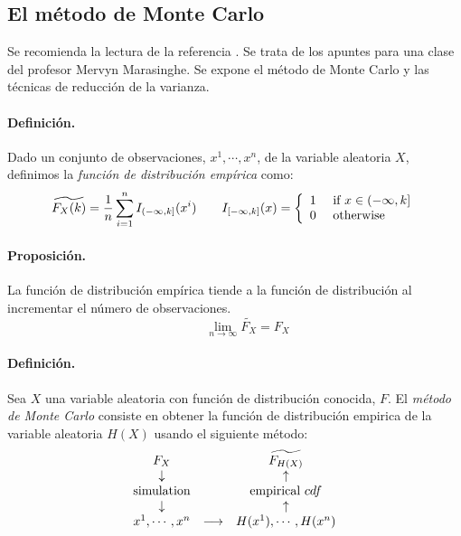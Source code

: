 \subsection{El m\'etodo de Monte Carlo}

Se recomienda la lectura de la referencia \cite{mc:mervyn}. Se trata de los 
apuntes para una clase del profesor Mervyn Marasinghe. Se expone el m\'etodo 
de Monte Carlo y las t\'ecnicas de reducci\'on de la varianza.

\paragraph{Definici\'on.} Dado un conjunto de observaciones, $x^1, \cdots, x^n$,
de la variable aleatoria $X$, definimos la \emph{funci\'on de distribuci\'on emp\'irica}
 como:
\begin{displaymath}
\widetilde{F_X(k)} = \frac{1}{n} \sum_{i=1}^{n} I_{(-\infty,k]}(x^i) \qquad
I_{[-\infty,k]}(x) = \left\{
\begin{array}{ll}
1 & \textrm{ if } x \in (-\infty,k] \cr
0 & \textrm{ otherwise}
\end{array}
\right.
\end{displaymath}

\paragraph{Proposici\'on.} La funci\'on de distribuci\'on emp\'irica tiende a 
la funci\'on de distribuci\'on al incrementar el n\'umero de observaciones.
\begin{displaymath}
\qquad \lim_{n\to\infty} \widetilde{F_X} = F_X
\end{displaymath}

\paragraph{Definici\'on.} Sea $X$ una variable aleatoria con funci\'on de 
distribuci\'on conocida, $F$. El \emph{m\'etodo de Monte Carlo} consiste en obtener la funci\'on de distribuci\'on empirica de
la variable aleatoria $H(X)$ usando el siguiente m\'etodo:
\begin{displaymath}
\begin{array}{ccc}
F_X                  &     \quad         & \widetilde{F_{H(X)}}   \cr
\downarrow         &     \quad         & \uparrow                \cr
\textrm{simulation} &     \quad         & \textrm{empirical } cdf \cr
\downarrow         &     \quad         & \uparrow                \cr
x^1,\cdots,x^n      & \longrightarrow & H(x^1),\cdots,H(x^n)  
\end{array}
\end{displaymath}

